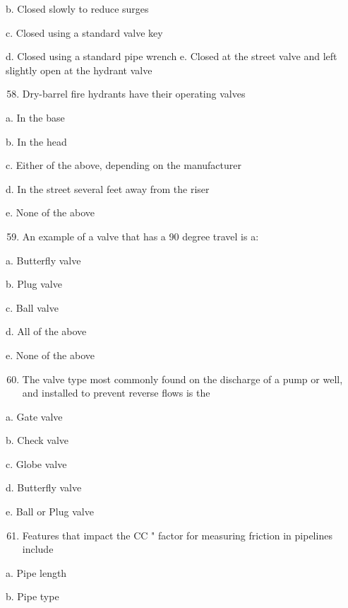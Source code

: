 \documentclass[10pt]{article}
\begin{document}
\begin{enumerate}
\begin{enumerate}
b. Closed slowly to reduce surges

c. Closed using a standard valve key

d. Closed using a standard pipe wrench e. Closed at the street valve and left slightly open at the hydrant valve

\begin{enumerate}
  \setcounter{enumi}{57}
  \item Dry-barrel fire hydrants have their operating valves
\end{enumerate}

a. In the base

b. In the head

c. Either of the above, depending on the manufacturer

d. In the street several feet away from the riser

e. None of the above

\begin{enumerate}
  \setcounter{enumi}{58}
  \item An example of a valve that has a 90 degree travel is a:
\end{enumerate}

a. Butterfly valve

b. Plug valve

c. Ball valve

d. All of the above

e. None of the above

\begin{enumerate}
  \setcounter{enumi}{59}
  \item The valve type most commonly found on the discharge of a pump or well, and installed to prevent reverse flows is the
\end{enumerate}

a. Gate valve

b. Check valve

c. Globe valve

d. Butterfly valve

e. Ball or Plug valve

\begin{enumerate}
  \setcounter{enumi}{60}
  \item Features that impact the $\mathrm{C} \mathrm{C}$ " factor for measuring friction in pipelines include
\end{enumerate}

a. Pipe length

b. Pipe type


\end{enumerate}
\end{enumerate}
\end{document}
